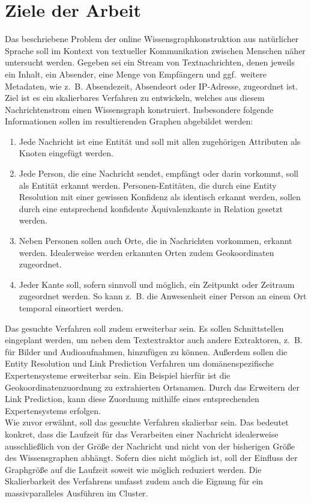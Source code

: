 \documentclass[11pt, a4paper]{scrreprt}
\begin{document}
\section{Ziele der Arbeit}

Das beschriebene Problem der online Wissensgraphkonstruktion aus natürlicher Sprache soll im Kontext von textueller Kommunikation zwischen Menschen näher untersucht werden.
Gegeben sei ein Stream von Textnachrichten, denen jeweils ein Inhalt, ein Absender, eine Menge von Empfängern und ggf.\ weitere Metadaten, wie z.~B. Absendezeit, Absendeort oder IP-Adresse, zugeordnet ist.
Ziel ist es ein skalierbares Verfahren zu entwickeln, welches aus diesem Nachrichtenstrom einen Wissensgraph konstruiert.
Insbesondere folgende Informationen sollen im resultierenden Graphen abgebildet werden:
\begin{enumerate}
	\item Jede Nachricht ist eine Entität und soll mit allen zugehörigen Attributen als Knoten eingefügt werden.
	\item Jede Person, die eine Nachricht sendet, empfängt oder darin vorkommt, soll als Entität erkannt werden.
		Personen-Entitäten, die durch eine Entity Resolution mit einer gewissen Konfidenz als identisch erkannt werden, sollen durch eine entsprechend konfidente Äquivalenzkante in Relation gesetzt werden.
	\item Neben Personen sollen auch Orte, die in Nachrichten vorkommen, erkannt werden.
		Idealerweise werden erkannten Orten zudem Geokoordinaten zugeordnet.
	\item Jeder Kante soll, sofern sinnvoll und möglich, ein Zeitpunkt oder Zeitraum zugeordnet werden.
		So kann z.~B. die Anwesenheit einer Person an einem Ort temporal einsortiert werden.
\end{enumerate}

Das gesuchte Verfahren soll zudem erweiterbar sein.
Es sollen Schnittstellen eingeplant werden, um neben dem Textextraktor auch andere Extraktoren, z.~B. für Bilder und Audioaufnahmen, hinzufügen zu können.
Außerdem sollen die Entity Resolution und Link Prediction Verfahren um domänenspezifische Expertensysteme erweiterbar sein.
Ein Beispiel hierfür ist die Geokoordinatenzuordnung zu extrahierten Ortsnamen.
Durch das Erweitern der Link Prediction, kann diese Zuordnung mithilfe eines entsprechenden Expertensystems erfolgen.\\

Wie zuvor erwähnt, soll das gesuchte Verfahren skalierbar sein.
Das bedeutet konkret, dass die Laufzeit für das Verarbeiten einer Nachricht idealerweise ausschließlich von der Größe der Nachricht und nicht von der bisherigen Größe des Wissensgraphen abhängt.
Sofern dies nicht möglich ist, soll der Einfluss der Graphgröße auf die Laufzeit soweit wie möglich reduziert werden.
Die Skalierbarkeit des Verfahrens umfasst zudem auch die Eignung für ein massivparalleles Ausführen im Cluster.\\
\end{document}
